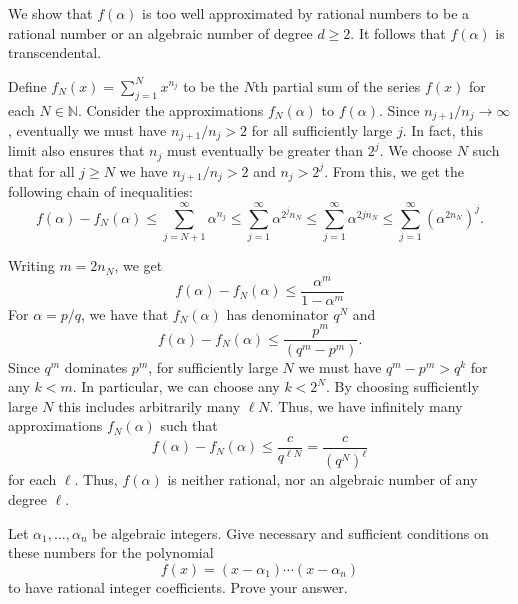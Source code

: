 \documentclass[12 pt, letterpaper]{hmcpset}
\begin{document}
\begin{solution}
	We show that $f(\alpha)$ is too well approximated by rational numbers to be a rational number or an algebraic number of degree $d \ge 2$. It follows that $f(\alpha)$ is transcendental.

	Define $f_{N}(x) = \sum_{j = 1}^{N} x^{n_{j}}$ to be the $N$th partial sum of the series $f(x)$ for each $N \in \mathbb{N}$. Consider the approximations $f_{N}(\alpha)$ to $f(\alpha)$. Since $n_{j + 1} / n_{j} \to \infty$, eventually we must have $n_{j + 1} / n_{j} > 2$ for all sufficiently large $j$. In fact, this limit also ensures that $n_{j}$ must eventually be greater than $2^{j}$. We choose $N$ such that for all $j \ge N$ we have $n_{j + 1} / n_{j} > 2$ and $n_{j} > 2^{j}$. From this, we get the following chain of inequalities:
	\[
		f(\alpha) - f_{N}(\alpha) \le \sum_{j = N + 1}^{\infty} \alpha^{n_{j}} \le \sum_{j = 1}^{\infty} \alpha^{2^{j} n _{N}} \le \sum_{j = 1}^{\infty} \alpha^{2 j n_{N}} \le \sum_{j = 1}^{\infty} (\alpha^{2 n_{N}})^{j}.
	\]

	Writing $m = 2 n_{N}$, we get
	\[
		f(\alpha) - f_{N}(\alpha) \le \frac{\alpha^{m}}{1 - \alpha^{m}}
	\]
	For $\alpha = p / q$, we have that $f_{N}(\alpha)$ has denominator $q^{N}$ and
	\[
		f(\alpha) - f_{N}(\alpha) \le \frac{p^{m}}{(q^{m} - p^{m})}.
	\]
	Since $q^{m}$ dominates $p^{m}$, for sufficiently large $N$ we must have $q^{m} - p^{m} > q^{k}$ for any $k < m$. In particular, we can choose any $k < 2^{N}$. By choosing sufficiently large $N$ this includes arbitrarily many $\ell N$. Thus, we have infinitely many approximations $f_{N}(\alpha)$ such that
	\[
		f(\alpha) - f_{N}(\alpha) \le \frac{c}{q^{\ell N}} = \frac{c}{(q^{N})^{\ell}}
	\]
	for each $\ell$. Thus, $f(\alpha)$ is neither rational, nor an algebraic number of any degree $\ell$.
\end{solution}

\pagebreak

\begin{problem}[Problem 8.]
	Let $\alpha_{1}, \dots, \alpha_{n}$ be algebraic integers. Give necessary and sufficient conditions on these numbers for the polynomial
	\[
		f(x) = (x - \alpha_{1}) \cdots (x - \alpha_{n})
	\]
	to have rational integer coefficients. Prove your answer.
\end{problem}
\end{document}
